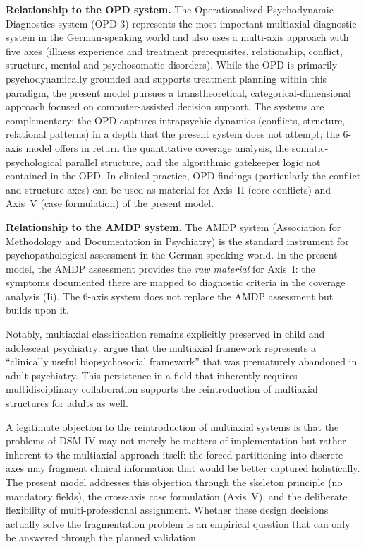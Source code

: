 \documentclass[11pt,a4paper]{article}
\begin{document}
\textbf{Relationship to the OPD system.} The Operationalized Psychodynamic Diagnostics system (OPD-3) represents the most important multiaxial diagnostic system in the German-speaking world and also uses a multi-axis approach with five axes (illness experience and treatment prerequisites, relationship, conflict, structure, mental and psychosomatic disorders). While the OPD is primarily psychodynamically grounded and supports treatment planning within this paradigm, the present model pursues a transtheoretical, categorical-dimensional approach focused on computer-assisted decision support. The systems are complementary: the OPD captures intrapsychic dynamics (conflicts, structure, relational patterns) in a depth that the present system does not attempt; the 6-axis model offers in return the quantitative coverage analysis, the somatic-psychological parallel structure, and the algorithmic gatekeeper logic not contained in the OPD. In clinical practice, OPD findings (particularly the conflict and structure axes) can be used as material for Axis~II (core conflicts) and Axis~V (case formulation) of the present model.

\textbf{Relationship to the AMDP system.} The AMDP system (Association for Methodology and Documentation in Psychiatry) is the standard instrument for psychopathological assessment in the German-speaking world. In the present model, the AMDP assessment provides the \textit{raw material} for Axis~I: the symptoms documented there are mapped to diagnostic criteria in the coverage analysis (Ii). The 6-axis system does not replace the AMDP assessment but builds upon it.

Notably, multiaxial classification remains explicitly preserved in child and adolescent psychiatry: \citet{BJPsychAdv2024} argue that the multiaxial framework represents a ``clinically useful biopsychosocial framework'' that was prematurely abandoned in adult psychiatry. This persistence in a field that inherently requires multidisciplinary collaboration supports the reintroduction of multiaxial structures for adults as well.

A legitimate objection to the reintroduction of multiaxial systems is that the problems of DSM-IV may not merely be matters of implementation but rather inherent to the multiaxial approach itself: the forced partitioning into discrete axes may fragment clinical information that would be better captured holistically. The present model addresses this objection through the skeleton principle (no mandatory fields), the cross-axis case formulation (Axis~V), and the deliberate flexibility of multi-professional assignment. Whether these design decisions actually solve the fragmentation problem is an empirical question that can only be answered through the planned validation.
\end{document}
